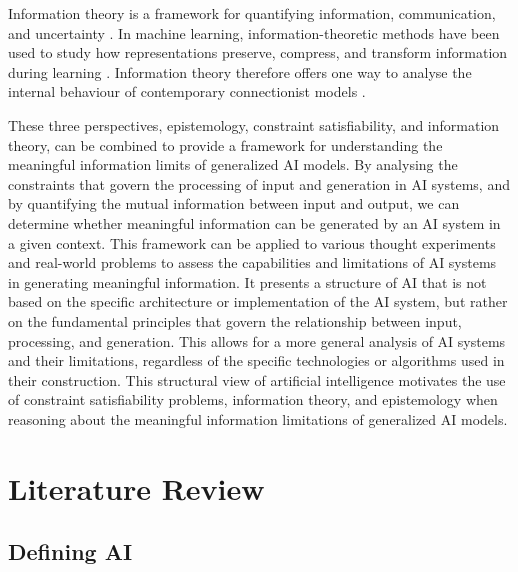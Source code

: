 \documentclass[stu,12pt]{apa7}
\theoremstyle{definition}
\begin{document}
Information theory is a framework for quantifying information, communication, and uncertainty \parencite{shannon1948mathematical}. In machine learning, information-theoretic methods have been used to study how representations preserve, compress, and transform information during learning \parencite{tishby2015deep,shwartz2017opening}. Information theory therefore offers one way to analyse the internal behaviour of contemporary connectionist models \parencite{shwartz2017opening}.

These three perspectives, epistemology, constraint satisfiability, and information theory, can be combined to provide a framework for understanding the meaningful information limits of generalized AI models. By analysing the constraints that govern the processing of input and generation in AI systems, and by quantifying the mutual information between input and output, we can determine whether meaningful information can be generated by an AI system in a given context. This framework can be applied to various thought experiments and real-world problems to assess the capabilities and limitations of AI systems in generating meaningful information. It presents a structure of AI that is not based on the specific architecture or implementation of the AI system, but rather on the fundamental principles that govern the relationship between input, processing, and generation. This allows for a more general analysis of AI systems and their limitations, regardless of the specific technologies or algorithms used in their construction. This structural view of artificial intelligence motivates the use of constraint satisfiability problems, information theory, and epistemology when reasoning about the meaningful information limitations of generalized AI models.

\section{Literature Review}

\subsection{Defining AI}
\end{document}
